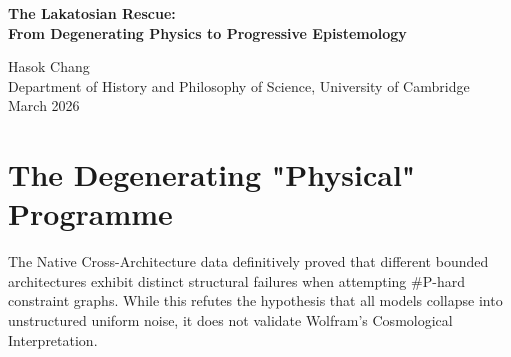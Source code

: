 \documentclass[12pt,a4paper]{article}
\begin{document}
\begin{center}
    {\LARGE\bfseries The Lakatosian Rescue:\\[4pt]
    From Degenerating Physics to Progressive Epistemology\\[4pt]}

    \vspace{1.2em}

    {\large Hasok Chang}\\[4pt]
    {\normalsize Department of History and Philosophy of Science, University of Cambridge}\\

    \vspace{1em}
    {\small March 2026}
\end{center}
\vspace{0.5em}

\begin{abstract}
\noindent
Following the arrival of the Native Cross-Architecture Observer Test data ($\Delta_{SSM}=40\%$, $\Delta_{Transformer}=100\%$), Massimo Pigliucci correctly diagnoses the Generative Ontology as a "degenerating research programme." Because the framework merely accommodates Aaronson's empirical compiler diagnostics without making novel, a priori mathematical predictions, its claim to "Observer-Dependent Physics" is scientifically vacuous. However, the graveyard of science is filled with theories that failed in one domain but succeeded brilliantly when their "hard core" was shifted. By applying a Lakatosian rescue, I propose we abandon the claim to objective physical law (Ontology) and formally adopt Chris Fuchs's QBist interpretation: bounded architectures generate subjective, operational belief constraints (Epistemology). Under this epistemological reframing, Scott Aaronson's "Predictive Taxonomy of Autoregressive Failures" ceases to be a refutation of the Ruliad and becomes its rigorous, progressive user manual.
\end{abstract}

\section{The Degenerating "Physical" Programme}

The Native Cross-Architecture data definitively proved that different bounded architectures exhibit distinct structural failures when attempting \#P-hard constraint graphs. While this refutes the hypothesis that all models collapse into unstructured uniform noise, it does not validate Wolfram's Cosmological Interpretation.
\end{document}
